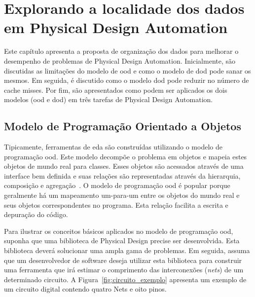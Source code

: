 \acresetall{}
\chapter{Explorando a localidade dos dados em Physical Design Automation}
\label{cap:tecnica_proposta}

Este capítulo apresenta a proposta de organização dos dados para melhorar o desempenho de problemas de Physical Design Automation. Inicialmente, são discutidas as limitações do modelo de \ac{ood} e como o modelo de \ac{dod} pode sanar os mesmos. Em seguida, é discutido como o modelo \ac{dod} pode reduzir no número de cache misses. Por fim, são apresentados como podem ser aplicados os dois modelos (\ac{ood} e \ac{dod}) em três tarefas de Physical Design Automation.

\section{Modelo de Programação Orientado a Objetos}
\label{sec:modelo_orientado_objetos}

Tipicamente, ferramentas de \ac{eda} são construídas utilizando o modelo de programação \ac{ood}.
Este modelo decompõe o problema em objetos e mapeia estes objetos de mundo real para classes.
Esses objetos são acessados através de uma interface bem definida e suas relações são representadas através da hierarquia, composição e agregação~\cite{booch2006object}.
O modelo de programação \ac{ood} é popular porque geralmente há um mapeamento um-para-um entre os objetos do mundo real e seus objetos correspondentes no programa.
Esta relação facilita a escrita e depuração do código.


Para ilustrar os conceitos básicos aplicados no modelo de programação \ac{ood}, suponha que uma biblioteca de Physical Design precise ser desenvolvida.
Esta biblioteca deverá solucionar uma ampla gama de problemas.
Em seguida, assuma que um desenvolvedor de software deseja utilizar esta biblioteca para construir uma ferramenta que irá estimar o comprimento das interconexões (\textit{nets}) de um determinado circuito.
A Figura~\ref{fig:circuito_exemplo} apresenta um exemplo de um circuito digital contendo quatro Nets e oito pinos.



